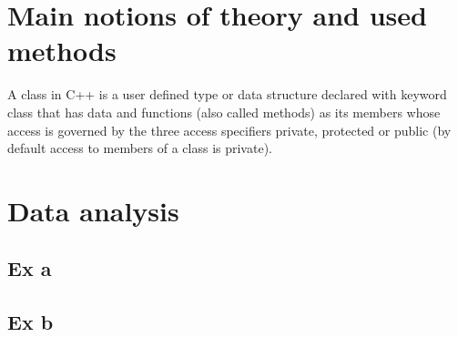 \documentclass{article}
\begin{document}
	\section{Main notions of theory and used methods}
		A class in C++ is a user defined type or data structure declared with keyword class that has data and functions (also called methods) as its members whose access is governed by the three access specifiers private, protected or public (by default access to members of a class is private).
	\pagebreak

	\section{Data analysis}
		\subsection{Ex a}
			
			\pagebreak

		\subsection{Ex b}
			
			\pagebreak
\end{document}
